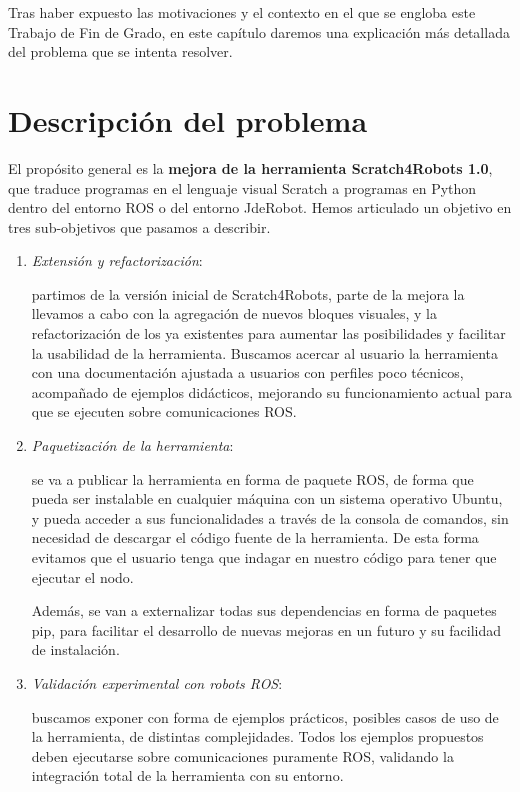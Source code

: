 ﻿Tras haber expuesto las motivaciones y el contexto en el que se engloba este Trabajo de Fin de Grado, en este capítulo daremos una explicación más detallada del problema que se intenta resolver.\\ 

\section{Descripción del problema}
\label{sec:descripcion del problema}
El propósito general es la \textbf{mejora de la herramienta Scratch4Robots 1.0}, que traduce programas en el lenguaje visual Scratch a programas en Python dentro del entorno ROS o del entorno JdeRobot. Hemos articulado un objetivo en tres sub-objetivos que pasamos a describir.
\begin{enumerate}
\item \textit{Extensión y refactorización}:

 partimos de la versión inicial de Scratch4Robots, parte de la mejora la llevamos a cabo con la agregación de nuevos bloques visuales, y la refactorización de los ya existentes para aumentar las posibilidades y facilitar la usabilidad de la herramienta. Buscamos acercar al usuario la herramienta con una documentación ajustada a usuarios con perfiles poco técnicos, acompañado de ejemplos didácticos, mejorando su funcionamiento actual para que se ejecuten sobre comunicaciones ROS.

\item \textit{Paquetización de la herramienta}:

 se va a publicar la herramienta en forma de paquete ROS, de forma que pueda ser instalable en cualquier máquina con un sistema operativo Ubuntu, y pueda acceder a sus funcionalidades a través de la consola de comandos, sin necesidad de descargar el código fuente de la herramienta. De esta forma evitamos que el usuario tenga que indagar en nuestro código para tener que ejecutar el nodo.

 Además, se van a externalizar todas sus dependencias en forma de paquetes pip, para facilitar el desarrollo de nuevas mejoras en un futuro y su facilidad de instalación.

\item \textit{Validación experimental con robots ROS}:

 buscamos exponer con forma de ejemplos prácticos, posibles casos de uso de la herramienta, de distintas complejidades. Todos los ejemplos propuestos deben ejecutarse sobre comunicaciones puramente ROS, validando la integración total de la herramienta con su entorno.
\end{enumerate}


